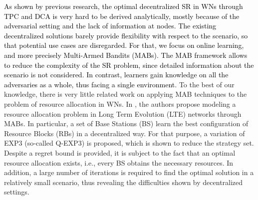 \documentclass{article}
\begin{document}
	\textcolor{black}{\textcolor{black}{As shown by previous research, the optimal decentralized SR in WNs through TPC and DCA is very hard to be derived analytically, mostly because of the adversarial setting and the lack of information at nodes. The existing decentralized solutions barely provide flexibility with respect to the scenario, so that potential use cases are disregarded.} For that, we focus on online learning, and more precisely Multi-Armed Bandits (MABs). The MAB framework allows to reduce the complexity of the SR problem, since detailed information about the scenario is not considered. In contrast, learners gain knowledge on all the adversaries as a whole, thus facing a single environment.} To the best of our knowledge, there is very little related work on applying MAB techniques to the problem of resource allocation in WNs. In \cite{coucheney2015multi}, the authors propose modeling a resource allocation problem in Long Term Evolution (LTE) networks through MABs. In particular, a set of Base Stations (BS) learn the best configuration of Resource Blocks (RBs) in a decentralized way. For that purpose, a variation of EXP3 (so-called Q-EXP3) is proposed, which is shown to reduce the strategy set. Despite a regret bound is provided, it is subject to the fact that an optimal resource allocation exists, i.e., every BS obtains the necessary resources. In addition, a large number of iterations is required to find the optimal solution in a relatively small scenario, thus revealing the difficulties shown by decentralized settings.
	
\end{document}
